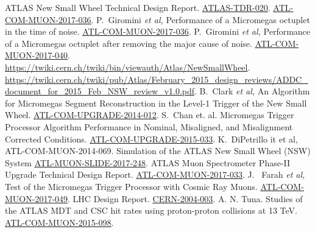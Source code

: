 \begin{thebibliography}{99}
\label{bibliography}
\setlength{\itemsep}{1.5pt plus 2.0pt minus 1.4pt}
\setlength{\parsep}{0pt}
\setlength{\parskip}{0pt}
\vspace{-6pt}
 ATLAS New Small Wheel Technical Design Report. \href{http://cds.cern.ch/record/1552862}{\color{blue}\underline{ATLAS-TDR-020}}.
 \href{https://cds.cern.ch/record/2272355}{\color{blue}\underline{ATL-COM-MUON-2017-036}}.
 P.~Giromini {\it et al,} Performance of a Micromegas octuplet in the time  of noise.
 \href{https://cds.cern.ch/record/2277316}{\color{blue}\underline{ATL-COM-MUON-2017-036}}.
 P.~Giromini  {\it et al,} Performance of a Micromegas octuplet after removing the major cause of noise.
 \href{https://cds.cern.ch/record/2277316}{\color{blue}\underline{ATL-COM-MUON-2017-040}}.
 \url{https://twiki.cern.ch/twiki/bin/viewauth/Atlas/NewSmallWheel}.
 \url{https://twiki.cern.ch/twiki/pub/Atlas/February_2015_design_reviews/ADDC_document_for_2015_Feb_NSW_review_v1.0.pdf}.
 B.~Clark {\it et al,} An Algorithm for Micromegas Segment
 Reconstruction in the Level-1 Trigger of the New Small Wheel. \href{https://cds.cern.ch/record/1706160}{\color{blue}\underline{ATL-COM-UPGRADE-2014-012}}.
 S.~Chan et. al. Micromegas Trigger Processor Algorithm Performance in Nominal, Misaligned, and Misalignment
 Corrected Conditions. \href{https://cds.cern.ch/record/2113121}{\color{blue}\underline{ATL-COM-UPGRADE-2015-033}}.
 K.~DiPetrillo  {it et al,} ATL-COM-MUON-2014-069.
 Simulation of the ATLAS New Small Wheel (NSW) System
 \href{http://cds.cern.ch/record/2265067}{\color{blue}\underline{ATL-MUON-SLIDE-2017-248}}.
 ATLAS Muon Spectrometer Phase-II Upgrade Technical Design Report.
 \href{https://cds.cern.ch/record/2270169/}{\color{blue}\underline{ATL-COM-MUON-2017-033}}.
 J. ~Farah {\it et al,} Test of the Micromegas Trigger Processor with Cosmic Ray Muons. 
\href{https://cds.cern.ch/record/2285496}{\color{blue}\underline{ATL-COM-MUON-2017-049}}.
 LHC Design Report. 
 \href{https://cds.cern.ch/record/782076}{\color{blue}\underline{CERN-2004-003}}.
 A. N. Tuna. Studies of the ATLAS MDT and CSC hit rates using proton-proton collisions at 13 TeV. 
  \href{https://cds.cern.ch/record/2111365}{\color{blue}\underline{ATL-COM-MUON-2015-098}}.
\end{thebibliography}









